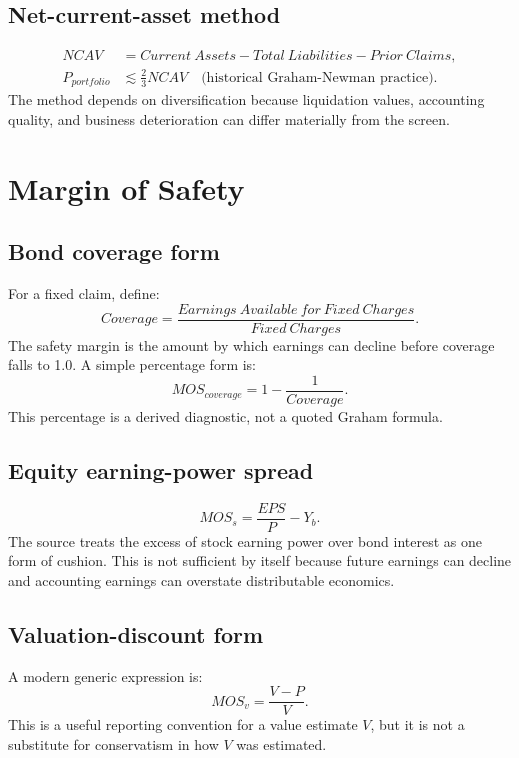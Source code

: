 \documentclass[11pt]{article}
\begin{document}
\subsection{Net-current-asset method}
\begin{align}
NCAV &= Current\ Assets-Total\ Liabilities-Prior\ Claims,\\
P_{portfolio} &\lesssim \frac{2}{3}NCAV \quad \text{(historical Graham-Newman practice)}.
\end{align}
The method depends on diversification because liquidation values, accounting quality, and business deterioration can differ materially from the screen.

\section{Margin of Safety}
\subsection{Bond coverage form}
For a fixed claim, define:
\begin{equation}
Coverage=\frac{Earnings\ Available\ for\ Fixed\ Charges}{Fixed\ Charges}.
\end{equation}
The safety margin is the amount by which earnings can decline before coverage falls to 1.0. A simple percentage form is:
\begin{equation}
MOS_{coverage}=1-\frac{1}{Coverage}.
\end{equation}
This percentage is a derived diagnostic, not a quoted Graham formula.

\subsection{Equity earning-power spread}
\begin{equation}
MOS_s=\frac{EPS}{P}-Y_b.
\end{equation}
The source treats the excess of stock earning power over bond interest as one form of cushion. This is not sufficient by itself because future earnings can decline and accounting earnings can overstate distributable economics.

\subsection{Valuation-discount form}
A modern generic expression is:
\begin{equation}
MOS_v=\frac{V-P}{V}.
\end{equation}
This is a useful reporting convention for a value estimate $V$, but it is not a substitute for conservatism in how $V$ was estimated.
\end{document}
